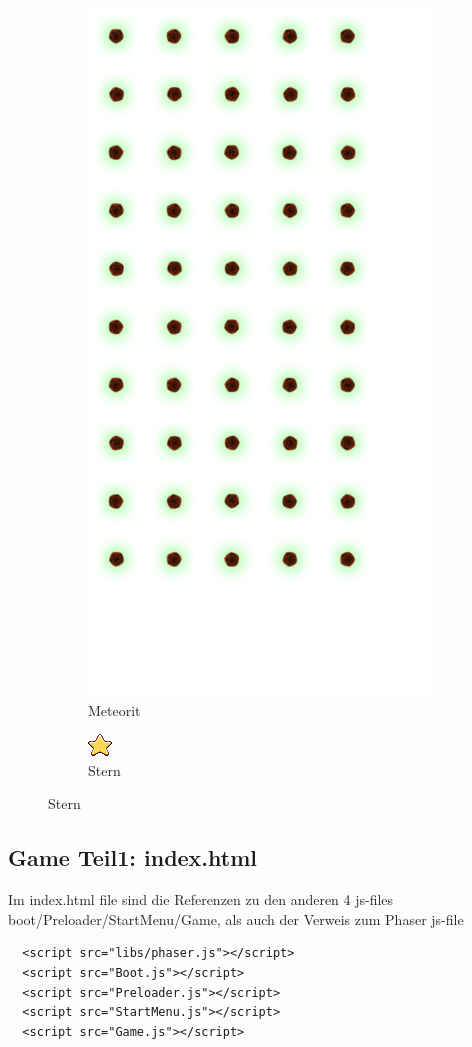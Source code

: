 \documentclass{article}
\begin{document}
\begin{figure}[ht]
\centering
\begin{subfigure}{.5\textwidth}
  \centering
  \includegraphics[width=.3\linewidth]{spacerock}
  \caption{Meteorit}
  \label{fig:sub1}
\end{subfigure}%
\begin{subfigure}{.5\textwidth}
  \centering
  \includegraphics[width=.3\linewidth]{star}
  \caption{Stern}
  \label{fig:sub2}
\end{subfigure}
\end{figure}








\cleardoublepage





\subsection{Game Teil1: index.html}

Im index.html file sind die Referenzen zu den anderen 4
js-files boot/Preloader/StartMenu/Game, als auch der Verweis zum Phaser js-file

\begin{lstlisting}
  <script src="libs/phaser.js"></script>
  <script src="Boot.js"></script>
  <script src="Preloader.js"></script>
  <script src="StartMenu.js"></script>
  <script src="Game.js"></script>
\end{lstlisting}
\end{document}
